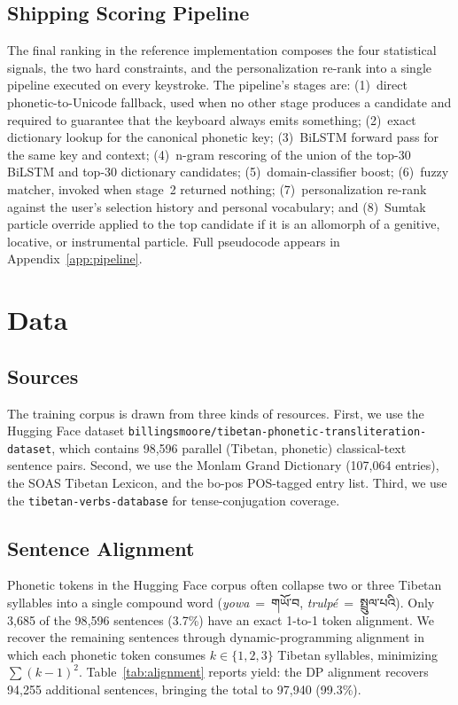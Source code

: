 \documentclass[11pt]{article}
\begin{document}
\subsection{Shipping Scoring Pipeline}
\label{sec:arch-pipeline}

The final ranking in the reference implementation composes the four statistical signals, the two hard constraints, and the personalization re-rank into a single pipeline executed on every keystroke. The pipeline's stages are: (1)~direct phonetic-to-Unicode fallback, used when no other stage produces a candidate and required to guarantee that the keyboard always emits something; (2)~exact dictionary lookup for the canonical phonetic key; (3)~BiLSTM forward pass for the same key and context; (4)~n-gram rescoring of the union of the top-30 BiLSTM and top-30 dictionary candidates; (5)~domain-classifier boost; (6)~fuzzy matcher, invoked when stage~2 returned nothing; (7)~personalization re-rank against the user's selection history and personal vocabulary; and (8)~Sumtak particle override applied to the top candidate if it is an allomorph of a genitive, locative, or instrumental particle. Full pseudocode appears in Appendix~\ref{app:pipeline}.

\section{Data}
\label{sec:data}

\subsection{Sources}

The training corpus is drawn from three kinds of resources. First, we use the Hugging Face dataset \texttt{billingsmoore/tibetan-phonetic-transliteration-dataset}, which contains 98{,}596 parallel (Tibetan, phonetic) classical-text sentence pairs. Second, we use the Monlam Grand Dictionary (107{,}064 entries), the SOAS Tibetan Lexicon, and the bo-pos POS-tagged entry list. Third, we use the \texttt{tibetan-verbs-database} for tense-conjugation coverage.

\subsection{Sentence Alignment}

Phonetic tokens in the Hugging Face corpus often collapse two or three Tibetan syllables into a single compound word (\textit{yowa}~=~གཡོ་བ, \textit{trulpé}~=~སྤྲུལ་པའི). Only 3{,}685 of the 98{,}596 sentences (3.7\%) have an exact 1-to-1 token alignment. We recover the remaining sentences through dynamic-programming alignment in which each phonetic token consumes $k \in \{1,2,3\}$ Tibetan syllables, minimizing $\sum (k-1)^2$. Table~\ref{tab:alignment} reports yield: the DP alignment recovers 94{,}255 additional sentences, bringing the total to 97{,}940 (99.3\%).
\end{document}
